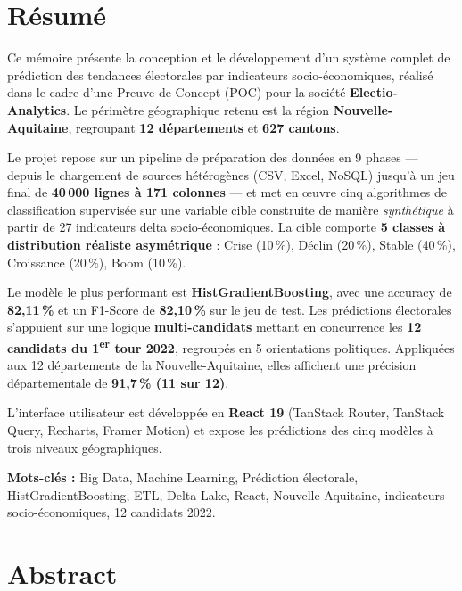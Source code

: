 \documentclass[12pt,a4paper,oneside]{report}
\newcommand{\pct}[1]{#1\,\%}
\begin{document}
\chapter*{Résumé}

Ce mémoire présente la conception et le développement d'un système complet de prédiction des tendances électorales par indicateurs socio-économiques, réalisé dans le cadre d'une Preuve de Concept (POC) pour la société \textbf{Electio-Analytics}. Le périmètre géographique retenu est la région \textbf{Nouvelle-Aquitaine}, regroupant \textbf{12 départements} et \textbf{627 cantons}.

Le projet repose sur un pipeline de préparation des données en 9 phases — depuis le chargement de sources hétérogènes (CSV, Excel, NoSQL) jusqu'à un jeu final de \textbf{40\,000 lignes à 171 colonnes} — et met en \oe{}uvre cinq algorithmes de classification supervisée sur une variable cible construite de manière \textit{synthétique} à partir de 27 indicateurs delta socio-économiques. La cible comporte \textbf{5 classes à distribution réaliste asymétrique} : Crise (\pct{10}), Déclin (\pct{20}), Stable (\pct{40}), Croissance (\pct{20}), Boom (\pct{10}).

Le modèle le plus performant est \textbf{HistGradientBoosting}, avec une accuracy de \textbf{\pct{82,11}} et un F1-Score de \textbf{\pct{82,10}} sur le jeu de test. Les prédictions électorales s'appuient sur une logique \textbf{multi-candidats} mettant en concurrence les \textbf{12 candidats du 1\textsuperscript{er} tour 2022}, regroupés en 5 orientations politiques. Appliquées aux 12 départements de la Nouvelle-Aquitaine, elles affichent une précision départementale de \textbf{\pct{91,7} (11 sur 12)}.

L'interface utilisateur est développée en \textbf{React 19} (TanStack Router, TanStack Query, Recharts, Framer Motion) et expose les prédictions des cinq modèles à trois niveaux géographiques.

\bigskip
\noindent\textbf{Mots-clés :} Big Data, Machine Learning, Prédiction électorale, HistGradientBoosting, ETL, Delta Lake, React, Nouvelle-Aquitaine, indicateurs socio-économiques, 12 candidats 2022.

\chapter*{Abstract}
\end{document}
